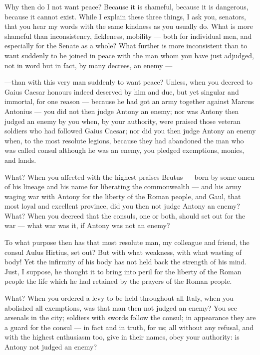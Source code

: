  Why then do I not want peace? Because it is shameful, because it is dangerous, because it cannot exist. While I explain these three things, I ask you, senators, that you hear my words with the same kindness as you usually do. What is more shameful than inconsistency, fickleness, mobility --- both for individual men, and especially for the Senate as a whole? What further is more inconsistent than to want suddenly to be joined in peace with the man whom you have just adjudged, not in word but in fact, by many decrees, an enemy ---

 ---than with this very man suddenly to want peace? Unless, when you decreed to Gaius Caesar honours indeed deserved by him and due, but yet singular and immortal, for one reason --- because he had got an army together against Marcus Antonius --- you did not then judge Antony an enemy; nor was Antony then judged an enemy by you when, by your authority, were praised those veteran soldiers who had followed Gaius Caesar; nor did you then judge Antony an enemy when, to the most resolute legions, because they had abandoned the man who was called consul although he was an enemy, you pledged exemptions, monies, and lands.

 What? When you affected with the highest praises Brutus --- born by some omen of his lineage and his name for liberating the commonwealth --- and his army waging war with Antony for the liberty of the Roman people, and Gaul, that most loyal and excellent province, did you then not judge Antony an enemy? What? When you decreed that the consuls, one or both, should set out for the war --- what war was it, if Antony was not an enemy?

 To what purpose then has that most resolute man, my colleague and friend, the consul Aulus Hirtius, set out? But with what weakness, with what wasting of body! Yet the infirmity of his body has not held back the strength of his mind. Just, I suppose, he thought it to bring into peril for the liberty of the Roman people the life which he had retained by the prayers of the Roman people.

 What? When you ordered a levy to be held throughout all Italy, when you abolished all exemptions, was that man then not judged an enemy? You see arsenals in the city; soldiers with swords follow the consul; in appearance they are a guard for the consul --- in fact and in truth, for us; all without any refusal, and with the highest enthusiasm too, give in their names, obey your authority: is Antony not judged an enemy?

